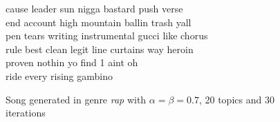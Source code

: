 \begin{figure}
\begin{mdframed}
cause leader sun nigga bastard push verse \\
end account high mountain ballin trash yall \\
pen tears writing instrumental gucci like chorus \\
rule best clean legit line curtains way heroin \\
proven nothin yo find 1 aint oh \\
ride every rising gambino
\caption{Song generated in genre \textit{rap} with $\alpha=\beta=0.7$, 20 topics and 30 iterations}
 \end{mdframed}
\label{text:rap_song}
\end{figure}